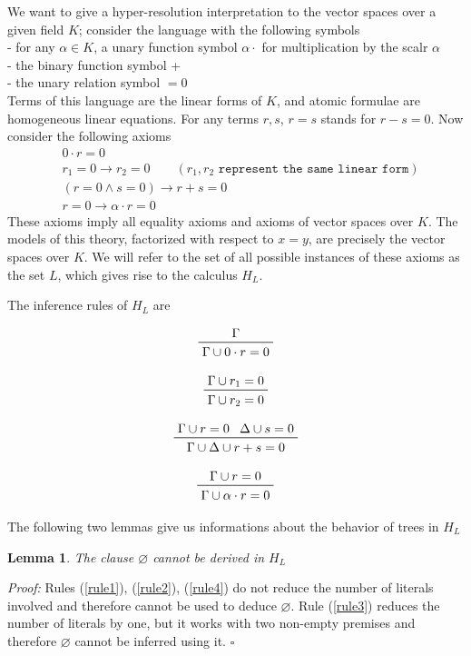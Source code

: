 \documentclass[a4paper,12pt,oneside]{book}
\newtheorem{lemma}[theorem]{Lemma}
\newcommand*{\QED}{\hfill\ensuremath{\square}}
\let\emptyset\varnothing
\let\e\wedge
\begin{document}
We want to give a hyper-resolution interpretation to the vector spaces over a given field $K$; consider the language with the following symbols\\
- for any $\alpha\in K$, a unary function symbol $\alpha\cdot$ for multiplication by the scalr $\alpha$\\
-  the binary function symbol +\\
- the unary relation symbol $=0$\\
Terms of this language are the linear forms of $K$, and atomic formulae are \\homogeneous linear equations. For any terms $r,s$, $r=s$ stands for $r-s=0$. Now consider the following axioms
\begin{eqnarray}
&0\cdot r =0 \\ \label{vec.spac1}
&r_1=0\rightarrow r_2 =0  \qquad (r_1,r_2 \texttt{ represent the same linear form}) \\
& ( r=0 \e s=0 )\rightarrow r+s =0 \\
& r=0 \rightarrow \alpha\cdot r =0 \label{vec.spac.ultimo}
\end{eqnarray}
These axioms imply all equality axioms and axioms of vector spaces over $K$. The models of this theory, factorized with respect to $x=y$, are precisely the vector spaces over $K$.
We will refer to the set of all possible instances of these axioms as the set $L$, which gives rise to the calculus $H_L$. 

\noindent The inference rules of $H_L$ are

\begin{equation} \label{rule1}
\prftree{\Gamma}{\Gamma\cup 0\cdot r=0 }
\end{equation}

\begin{equation} \label{rule2}
\prftree{\Gamma\cup r_1=0 }{\Gamma\cup r_2=0 }
\end{equation}

\begin{equation} \label{rule3}
\prftree{\Gamma\cup r=0} {\Delta\cup s=0 }{\Gamma\cup\Delta\cup  r+s=0}
\end{equation}

\begin{equation} \label{rule4}
\prftree{\Gamma\cup r=0}{\Gamma\cup \alpha\cdot r=0 }
\end{equation}

\noindent The following two lemmas give us informations about the behavior of trees in $H_L$
\begin{lemma}\label{lemma_nempty}
The clause $\emptyset$ cannot be derived in $H_L$
\end{lemma}
\textit{Proof:} Rules (\ref{rule1}), (\ref{rule2}), (\ref{rule4}) do not reduce the number of literals involved and therefore cannot be used to deduce $\emptyset$. Rule (\ref{rule3}) reduces the number of literals by one, but it works with two non-empty premises and therefore $\emptyset$ cannot be inferred using it. \QED
\end{document}

